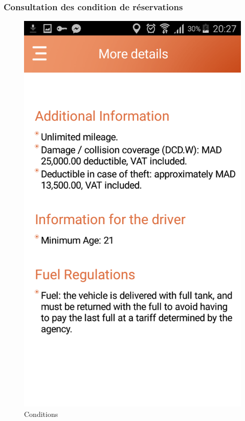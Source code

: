 \documentclass[12pt,a4paper]{report}
\begin{document}
	\subsubsection{Consultation des condition de réservations}
	\vspace{2cm}
	\begin{figure}[!hbtp]
		\centering
		\includegraphics[scale=0.2]{./graphics/More.png}
		\caption{Conditions}
		\end{figure}
		\newpage
	
\end{document}
